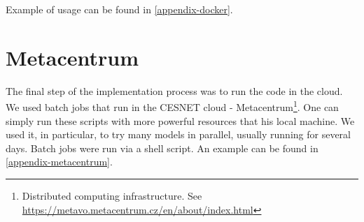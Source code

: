 \noindent
Example of usage can be found in \autoref{appendix-docker}.

\section{Metacentrum}

The final step of the implementation process was to run the code in the cloud. We used batch jobs \cite{metacentrum} that run in the CESNET cloud - Metacentrum\footnote{Distributed computing infrastructure. See \url{https://metavo.metacentrum.cz/en/about/index.html}}. One can simply run these scripts with more powerful resources that his local machine. We used it, in particular, to try many models in parallel, usually running for several days. Batch jobs were run via a shell script. An example can be found in \autoref{appendix-metacentrum}.
